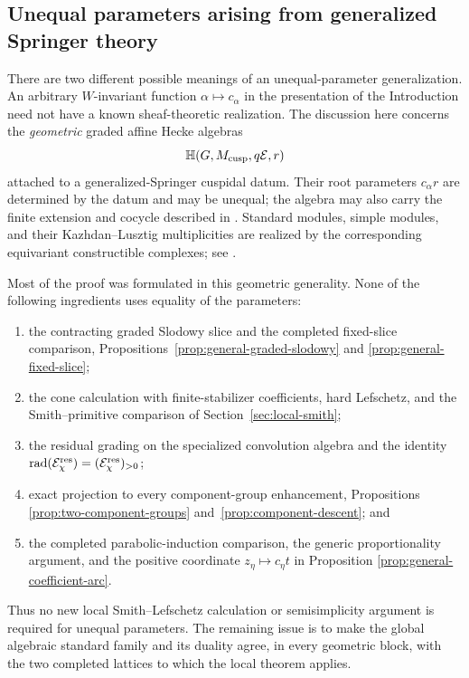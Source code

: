 \documentclass[11pt]{amsart}
\theoremstyle{definition}
\theoremstyle{remark}
\begin{document}
\subsection{Unequal parameters arising from generalized Springer theory}

There are two different possible meanings of an unequal-parameter
generalization.  An arbitrary $W$-invariant function
$\alpha\mapsto c_\alpha$ in the presentation of the Introduction need not
have a known sheaf-theoretic realization.  The discussion here concerns the
\emph{geometric} graded affine Hecke algebras
\[
 \mathbb H(G,M_{\rm cusp},q\mathcal E,r)
\]
attached to a generalized-Springer cuspidal datum.  Their root parameters
$c_\alpha r$ are determined by the datum and may be unequal; the algebra may
also carry the finite extension and cocycle described in
\cite[Section~2]{AMS}.  Standard modules, simple modules, and their
Kazhdan--Lusztig multiplicities are realized by the corresponding equivariant
constructible complexes; see \cite[Sections~2--5]{Solleveld}.

Most of the proof was formulated in this geometric generality.  None of the
following ingredients uses equality of the parameters:
\begin{enumerate}[label=\textup{(G\arabic*)},leftmargin=2.8em]
\item the contracting graded Slodowy slice and the completed fixed-slice
comparison, Propositions~\ref{prop:general-graded-slodowy} and
\ref{prop:general-fixed-slice};
\item the cone calculation with finite-stabilizer coefficients, hard
Lefschetz, and the Smith--primitive comparison of
Section~\ref{sec:local-smith};
\item the residual grading on the specialized convolution algebra and the
identity
$\operatorname{rad}(\mathcal E_\chi^{\rm res})
=(\mathcal E_\chi^{\rm res})_{>0}$;
\item exact projection to every component-group enhancement, Propositions
\ref{prop:two-component-groups} and~\ref{prop:component-descent}; and
\item the completed parabolic-induction comparison, the generic
proportionality argument, and the positive coordinate
$z_\eta\mapsto c_\eta t$ in Proposition
\ref{prop:general-coefficient-arc}.
\end{enumerate}
Thus no new local Smith--Lefschetz calculation or semisimplicity argument is
required for unequal parameters.  The remaining issue is to make
the global algebraic standard family and its duality agree, in every
geometric block, with the two completed lattices to which the local theorem
applies.
\end{document}
